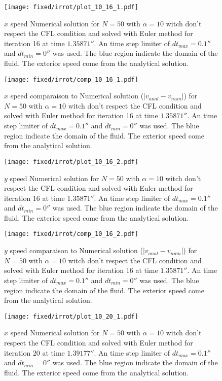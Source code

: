 \begin{figure}
\texttt{[image: fixed/irrot/plot\_10\_16\_1.pdf]}
\caption{$x$ speed Numerical solution for $N=50$ with $\alpha=10$ witch don't respect the CFL condition and solved with Euler method
for iteration 16 at time $\unit{1.35871}{\second}$.
An time step limiter of $dt_{max}=\unit{0.1}{\second}$ and $dt_{min}=\unit{0}{\second}$ was used.
The blue region indicate the domain of the fluid. The exterior speed come from the analytical solution.
\label{fix:plot_10_16_1}
}
\end{figure}

\begin{figure}
\texttt{[image: fixed/irrot/comp\_10\_16\_1.pdf]}
\caption{$x$ speed comparaison to Numerical solution ($|v_{anal}-v_{num}|$) for $N=50$ with $\alpha=10$ witch don't respect the CFL condition and solved with Euler method
for iteration 16 at time $\unit{1.35871}{\second}$.
An time step limiter of $dt_{max}=\unit{0.1}{\second}$ and $dt_{min}=\unit{0}{\second}$ was used.
The blue region indicate the domain of the fluid. The exterior speed come from the analytical solution.
\label{fix:comp_10_16_1}
}
\end{figure}

\clearpage

\begin{figure}
\texttt{[image: fixed/irrot/plot\_10\_16\_2.pdf]}
\caption{$y$ speed Numerical solution for $N=50$ with $\alpha=10$ witch don't respect the CFL condition and solved with Euler method
for iteration 16 at time $\unit{1.35871}{\second}$.
An time step limiter of $dt_{max}=\unit{0.1}{\second}$ and $dt_{min}=\unit{0}{\second}$ was used.
The blue region indicate the domain of the fluid. The exterior speed come from the analytical solution.
\label{fix:plot_10_16_2}
}
\end{figure}

\begin{figure}
\texttt{[image: fixed/irrot/comp\_10\_16\_2.pdf]}
\caption{$y$ speed comparaison to Numerical solution ($|v_{anal}-v_{num}|$) for $N=50$ with $\alpha=10$ witch don't respect the CFL condition and solved with Euler method
for iteration 16 at time $\unit{1.35871}{\second}$.
An time step limiter of $dt_{max}=\unit{0.1}{\second}$ and $dt_{min}=\unit{0}{\second}$ was used.
The blue region indicate the domain of the fluid. The exterior speed come from the analytical solution.
\label{fix:comp_10_16_2}
}
\end{figure}

\begin{figure}
\texttt{[image: fixed/irrot/plot\_10\_20\_1.pdf]}
\caption{$x$ speed Numerical solution for $N=50$ with $\alpha=10$ witch don't respect the CFL condition and solved with Euler method
for iteration 20 at time $\unit{1.39177}{\second}$.
An time step limiter of $dt_{max}=\unit{0.1}{\second}$ and $dt_{min}=\unit{0}{\second}$ was used.
The blue region indicate the domain of the fluid. The exterior speed come from the analytical solution.
\label{fix:plot_10_20_1}
}
\end{figure}

